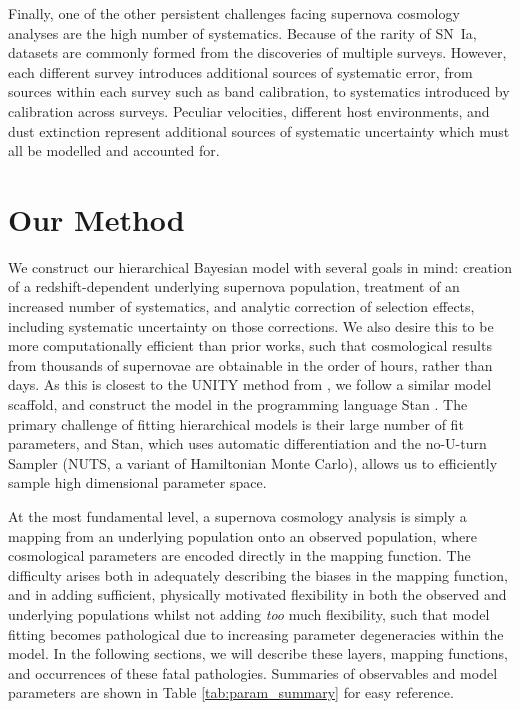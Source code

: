\documentclass[a4paper,fleqn,usenatbib]{mnras}
\newcommand{\green}{\color{forestgreen}}
\newcommand{\rubin}{\citetalias{Rubin2015}}
\begin{document}
Finally, one of the other persistent challenges facing supernova cosmology analyses are the high number of systematics. Because of the rarity of SN~Ia, datasets are commonly formed from the discoveries of multiple surveys. However, each different survey introduces additional sources of systematic error, from sources within each survey such as band calibration, to systematics introduced by calibration across surveys. Peculiar velocities, different host environments, and dust extinction represent additional sources of systematic uncertainty which must all be modelled and accounted for. 



\section{Our Method}
\label{sec:method}

We construct our hierarchical Bayesian model with several goals in mind: creation of a redshift-dependent underlying supernova population, {\green treatment of an increased number of systematics}, and analytic correction of selection effects, including systematic uncertainty on those corrections. We also desire this to be more computationally efficient than prior works, such that cosmological results from thousands of supernovae are obtainable in the order of hours, rather than days. As this is closest to the UNITY method from \citet[][hereafter denoted \rubin]{Rubin2015}, we follow a similar model scaffold, and construct the model in the programming language Stan \citep{Carpenter2017, StanDevelopmentTeam2017}. The primary challenge of fitting hierarchical models is their large number of fit parameters, and Stan, which uses automatic differentiation and the no-U-turn Sampler (NUTS, a variant of Hamiltonian Monte Carlo), allows us to efficiently sample high dimensional parameter space.

At the most fundamental level, a supernova cosmology analysis is simply a mapping from an underlying population onto an observed population, where {\green cosmological parameters are} encoded directly in the mapping function. The difficulty arises both in adequately describing the biases in the mapping function, and in adding sufficient, physically motivated flexibility in both {\green the observed and underlying} populations whilst not adding \textit{too} much flexibility, such that model fitting becomes pathological due to increasing parameter degeneracies within the model. In the following sections, we will describe these layers, mapping functions, and occurrences of these fatal pathologies. Summaries of observables and model parameters are shown in Table \ref{tab:param_summary} for easy reference.
\end{document}
